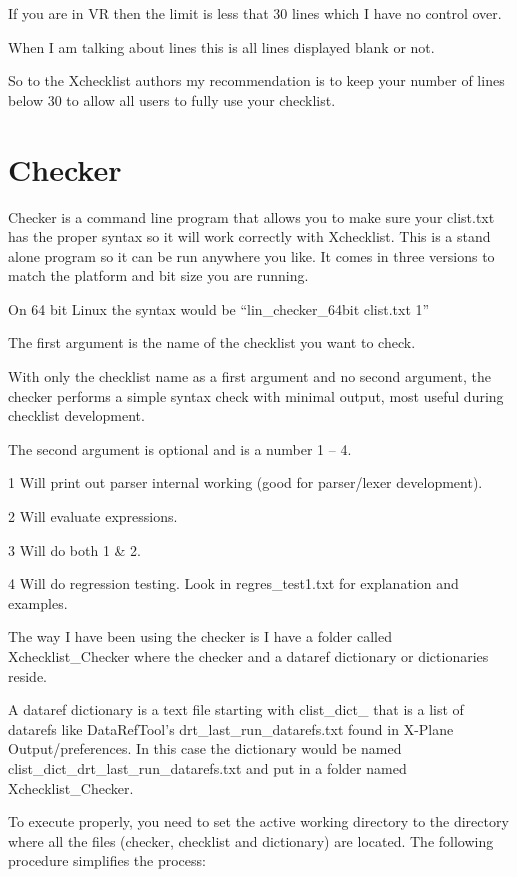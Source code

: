 \documentclass[11pt,parskip=half,a4paper]{scrartcl}
\begin{document}
If you are in VR then the limit is less that 30 lines which I have no control over.

When I am talking about lines this is all lines displayed blank or not.

So to the Xchecklist authors my recommendation is to keep your number of lines below 30 to allow all users to fully use your checklist.

\newpage
\section{Checker}


Checker is a command line program that allows you to make sure your clist.txt has the proper syntax so it will work correctly with Xchecklist. This is a stand alone program so it can be run anywhere you like. It comes in three versions to match the platform and bit size you are running.

On 64 bit Linux the syntax would be ``lin\_checker\_64bit clist.txt 1''

The first argument is the name of the checklist you want to check.

With only the checklist name as a first argument and no second argument, the checker performs a simple syntax check with minimal output, most useful during checklist development.

The second argument is optional and is a number 1 -- 4.

1 Will print out parser internal working (good for parser/lexer development).

2 Will evaluate expressions.

3 Will do both 1 \& 2.

4 Will do regression testing. Look in regres\_test1.txt for explanation and examples.

The way I have been using the checker is I have a folder called Xchecklist\_Checker where the checker and a dataref dictionary or dictionaries reside.

A dataref dictionary is a text file starting with clist\_dict\_ that is a list of datarefs like DataRefTool's
drt\_last\_run\_datarefs.txt found in X-Plane Output/preferences. In this case the dictionary would be named
clist\_dict\_drt\_last\_run\_datarefs.txt and put in a folder named Xchecklist\_Checker.

To execute properly, you need to set the active working directory to the directory where all the files (checker,
checklist and dictionary) are located. The following procedure simplifies the process:
\end{document}

